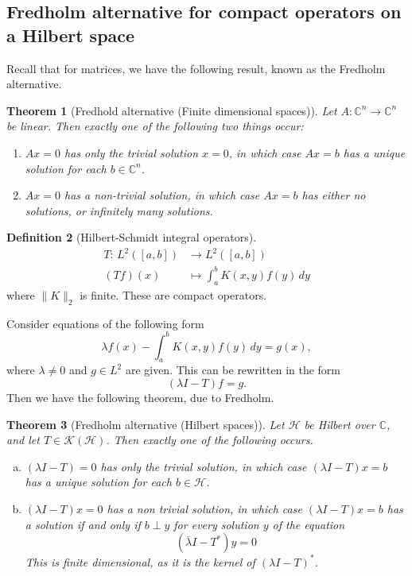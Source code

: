 \documentclass[10pt, oneside, reqno]{amsart}
\theoremstyle{plain}%
\newtheorem{thm}{Theorem}[section]
\theoremstyle{definition}
\newtheorem{defn}[thm]{Definition}
\theoremstyle{remark}
\newcommand{\Com}{\mathbb{C}}
\newcommand{\mapping}[5]{\begin{align*}
    #1 : \,     #2 &\rightarrow #3 \\
            #4  &\mapsto #5
\end{align*}    
}
\begin{document}
\subsection{Fredholm alternative for compact operators on a Hilbert space} %
\label{sub:fredholm_alternative_for_compact_operators_on_hilbert_space}

Recall that for matrices, we have the following result, known as the Fredholm alternative.    

\begin{thm}[Fredhold alternative (Finite dimensional spaces)]
    Let $A: \Com^n \rightarrow \Com^n$ be linear.  Then exactly one of the following two things occur:
    \begin{enumerate}[(1)]
        \item $Ax = 0$ has only the trivial solution $x = 0$, in which case $Ax = b$ has a unique solution for each $b \in \Com^n$.  
        \item $Ax = 0$ has a non-trivial solution, in which case $Ax = b$ has either no solutions, or infinitely many solutions.
    \end{enumerate}
\end{thm}

\begin{defn}[Hilbert-Schmidt integral operators]
    \mapping{T}{L^2([a,b])}{L^2([a,b])}{(Tf)(x)}{\int_a^bK(x, y) f(y) \, dy} where $\| K \|_2$ is finite.  These are compact operators.    
\end{defn}

Consider equations of the following form\[
    \lambda f(x) - \int_a^b K(x, y) f(y) \, dy = g(x),
\] where $\lambda \neq 0$ and $g \in L^2$ are given. This can be rewritten in the form \[
    (\lambda I - T) f = g.
\]  Then we have the following theorem, due to Fredholm. 

\begin{thm}[Fredholm alternative (Hilbert spaces)]
    Let $\mathcal H$ be Hilbert over $\Com$, and let $T \in \mathcal K(\mathcal H)$.  Then exactly one of the following occurs.
    \begin{enumerate}[(a)]
        \item $(\lambda I - T) = 0$ has only the trivial solution, in which case $(\lambda I - T)x = b$ has a unique solution for each $b \in \mathcal H$.  
        \item $(\lambda I - T) x = 0$ has a non trivial solution, in which case $(\lambda I - T) x = b$ has a solution if and only if $b \perp y$ for every solution $y$ of the equation \[
            (\overline \lambda I - T^*) y = 0
        \]  This is finite dimensional, as it is the kernel of $(\lambda I - T)^*$.   
    \end{enumerate}
\end{thm}
    
\end{document}
